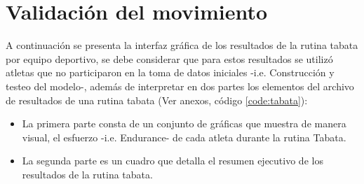 \section{Validaci\'on del movimiento} \label{res:valResults}
A continuaci\'on se presenta la interfaz gr\'afica de los resultados de la rutina tabata por equipo deportivo, se debe considerar que para estos resultados se utiliz\'o atletas que no participaron en la toma de datos iniciales -i.e. Construcci\'on y testeo del modelo-, adem\'as de interpretar en dos partes los elementos del archivo de resultados de una rutina tabata (Ver anexos, c\'odigo \ref{code:tabata}):
\begin{itemize}
\item La primera parte consta de un conjunto de gr\'aficas que muestra de manera visual, el esfuerzo -i.e. Endurance- de cada atleta durante la rutina Tabata.
\item La segunda parte es un cuadro que detalla el  resumen ejecutivo de los resultados de la rutina tabata.
\end{itemize}
